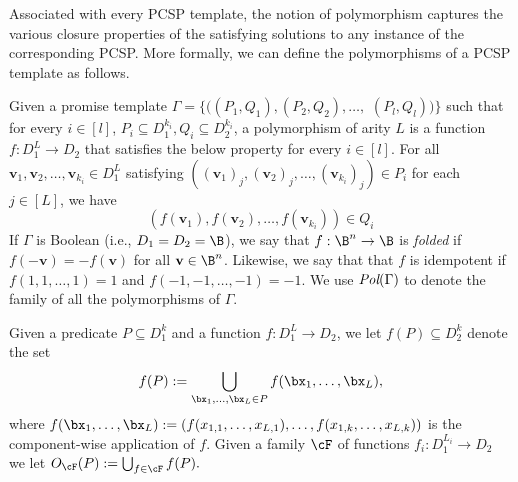 Associated with every PCSP {template, the notion of polymorphism captures the various} closure properties of the satisfying solutions {to any instance of the corresponding PCSP.} More formally, we can define the polymorphisms of a PCSP {template} as follows. 

\begin{definition}
	{Given a promise template} $\Gamma = \{ ((P_1,Q_1), (P_2, Q_2), \ldots,$ $(P_l,Q_l))\}$ such that for every $i \in [l]$, $P_i\subseteq D_1^{k_i}, Q_i\subseteq D_2^{k_i}$, a polymorphism of arity ${L}$ is a function $f:D_1^{{L}} \rightarrow D_2$ that satisfies the below property for every $i \in [l]$.
	For all $\textbf{v}_1,\textbf{v}_2,\ldots,\textbf{v}_{k_i}\in D_1^{L}$ satisfying $( (\textbf{v}_1)_j, (\textbf{v}_2)_j, \ldots, (\textbf{v}_{k_i})_j ) \in P_i$ for each $j \in [{L}]$, we have 
	\[
	(f(\textbf{v}_1), f(\textbf{v}_2), \ldots , f(\textbf{v}_{k_i})) \in Q_i
	\]
    {If $\Gamma$ is Boolean (i.e., $D_1 = D_2 =\B$), we say that $f:\B^n\rightarrow \B$ is \emph{folded} if $f(-\textbf{v})=-f(\textbf{v})$ for all $\textbf{v}\in \B^n$.} {Likewise, we say that that $f$ is idempotent if $f(1,1,\ldots,1)=1$ and ${f(-1,-1,\ldots,-1)=-1}$.}
	We use $\emph{Pol}(\Gamma)$ to denote the family of all the polymorphisms of {$\Gamma$}.
\end{definition}

{Given a predicate $P \subseteq D_1^k$ and a function $f : D_1^L \to D_2$, we let $f(P) \subseteq D_2^k$ denote the set
\[
    f(P) := \bigcup_{\bx_1, \hdots, \bx_L \in P} f(\bx_1, \hdots, \bx_L),
\]
where $f(\bx_1,\hdots, \bx_L) := (f(x_{1,1},\hdots, x_{L,1}), \hdots, f(x_{1,k}, \hdots, x_{L,k}))$ is the component-wise application of $f$.}
Given a family $\cF$ of functions $f_i : D_1^{L_i} \to D_2$ 
we let $O_{\cF}(P) := \bigcup_{f \in \cF} f(P).$ 
